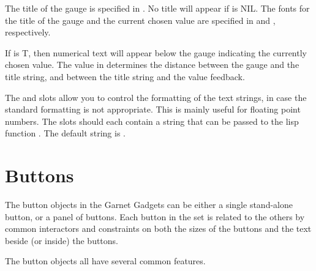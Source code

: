 The title of the gauge is specified in .  No title will
appear if  is NIL.  The fonts for the title of the gauge
and the current chosen value are specified in  and
, respectively.

If  is T, then numerical text will appear below the
gauge indicating the currently chosen value.  The value in 
determines the distance between the gauge and the title string, and between
the title string and the value feedback.

The  and  slots allow you to
control the formatting of the text strings, in case the standard formatting
is not appropriate.  This is mainly useful for floating point numbers.
The slots should each contain a string that can be passed to the lisp function
.  The default string is .



\section{Buttons}
\label{buttons}

The button objects in the Garnet Gadgets can be either a single
stand-alone button, or a panel of buttons.  Each button in the set is
related to the others by common interactors and constraints on both
the sizes of the buttons and the text beside (or inside) the buttons.

The button objects all have several common features.

